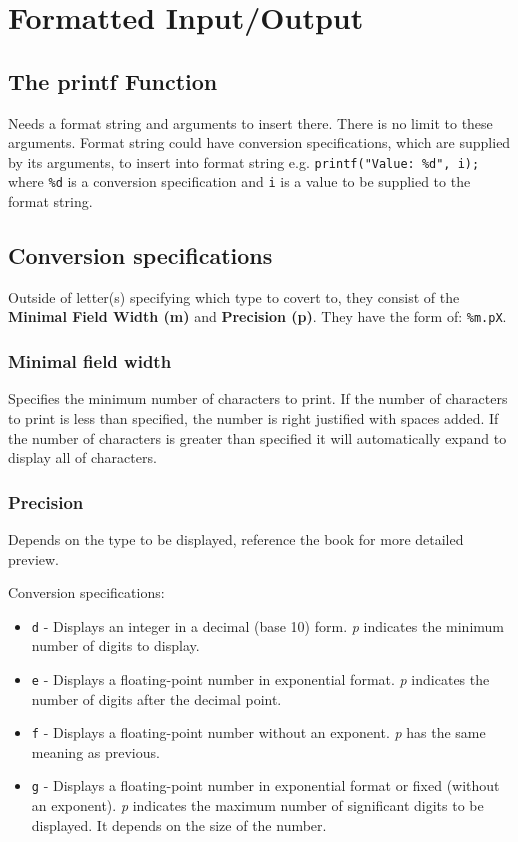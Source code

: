 \documentclass[12pt, openany]{book}
\begin{document}
    \chapter{Formatted Input/Output}

    \section{The printf Function}
    Needs a format string and arguments to insert there. There is no limit to these
    arguments. Format string could have conversion specifications, which are supplied by
    its arguments, to insert into format string e.g. \texttt{printf("Value: \%d", i);}
    where \texttt{\%d} is a conversion specification and \texttt{i} is a value to be
    supplied to the format string.

    \section{Conversion specifications}
    Outside of letter(s) specifying which type to covert to, they consist of the \textbf{Minimal
    Field Width (m)} and \textbf{Precision (p)}. They have the form of: \texttt{\%m.pX}.

    \subsection*{Minimal field width}
    Specifies the minimum number of characters to print. If the number of characters
    to print is less than specified, the number is right justified with spaces added. If the number of
    characters is greater than specified it will automatically expand to display all of characters.

    \subsection*{Precision}
    Depends on the type to be displayed, reference the book for more detailed preview. 
    \newpage

    Conversion specifications:
    \begin{itemize}
        \item \texttt{d} - Displays an integer in a decimal (base 10) form. \textit{p} indicates
        the minimum number of digits to display.
        \item \texttt{e} - Displays a floating-point number in exponential format. \textit{p}
        indicates the number of digits after the decimal point.
        \item \texttt{f} - Displays a floating-point number without an exponent. \textit{p} has
        the same meaning as previous.
        \item \texttt{g} - Displays a floating-point number in exponential format or
        fixed (without an exponent). \textit{p} indicates the maximum number of
        significant digits to be displayed. It depends on the size of the number.
    \end{itemize}
\end{document}

